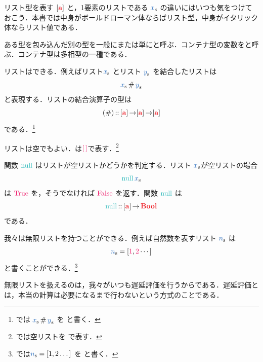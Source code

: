 \documentclass[a5paper,twoside,fleqn,draft]{jsbook}
\begin{document}
リスト型を表す $\hListConstruct{\hTypeName{a}}$ と，1要素のリストである $\hListVar{x}$ の違いにはいつも気をつけておこう．本書では中身がボールドローマン体ならばリスト型，中身がイタリック体ならリスト値である．

ある型を包み込んだ別の型を一般にまたは単にと呼ぶ．コンテナ型の変数をと呼ぶ．コンテナ型は多相型の一種である．


\separator

リストはできる．例えばリスト$\hListVar{x}$ とリスト
$\hListVar{y}$ を結合したリストは
\begin{equation}
  \hListVar{x}\hAppend\hListVar{y}
\end{equation}
と表現する．リストの結合演算子の型は
\begin{equation}
  (\hAppend)
  \hIsTypeOf{}\hListConstruct{\hTypeName{a}}\hFunctionArrow\hListConstruct{\hTypeName{a}}\hFunctionArrow\hListConstruct{\hTypeName{a}}
\end{equation}
である．\footnote{\haskell では $\hListVar{x}\hAppend\hListVar{y}$ を  と書く．}

\separator

リストは空でもよい．は$\mEmptyList$で表す．\footnote{\haskell では空リストを \code{[]} で表す．}

関数 $\hNull$ はリストが空リストかどうかを判定する．リスト $\hListVar{x}$が空リストの場合
\begin{equation}
  \hNull\hListVar{x}
\end{equation}
は $\hTrue$ を，そうでなければ $\hFalse$ を返す．関数 $\hNull$ は
\begin{equation}
\hNull\hIsTypeOf{}\hListConstruct{\hTypeName{a}}\hFunctionArrow\hBool
\end{equation}
である．

\separator

我々は無限リストを持つことができる．例えば自然数を表すリスト
$\hListVar{n}$ は
\begin{equation*}
  \hListVar{n}
  =\hListWith{\hConstant{1},\hConstant{2}\dotsb}
\end{equation*}
と書くことができる．\footnote{\haskell では$\hListVar{n}=\hListWith{1,2\dots}$ を  と書く．}

無限リストを扱えるのは，我々がいつも遅延評価を行うからである．遅延評価とは，本当の計算は必要になるまで行わないという方式のことである．
\end{document}
